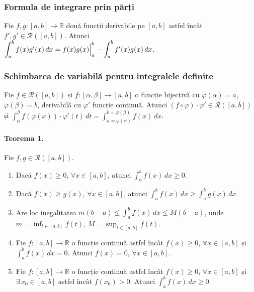 \subsubsection{Formula de integrare prin părți}
Fie $f, g:[a,b] \rightarrow \mathbb{R}$ două funcții derivabile pe $[a,b]$ astfel încât $f', g' \in \mathcal{R}([a,b])$.
Atunci \\ $\displaystyle\int_{a}^{b} f(x)g'(x) \, dx = \Bigl.f(x)g(x) \Bigr|_{a}^{b} - \displaystyle\int_{a}^{b} f'(x)g(x) \, dx$.

\subsubsection{Schimbarea de variabilă pentru integralele definite}
Fie $f \in \mathcal{R}([a,b])$ și $f:[\alpha, \beta] \rightarrow [a,b]$ o funcție bijectivă cu $\varphi(\alpha) = a$,
$\varphi(\beta) = b$, derivabilă cu $\varphi'$ funcție continuă. Atunci $(f \circ \varphi) \cdot \varphi' \in \mathcal{R}([a,b])$
și $\displaystyle\int_{\alpha}^{\beta} f(\varphi(x)) \cdot \varphi'(t) \, dt = \displaystyle\int_{a = \varphi(\alpha)}^{b = \varphi(\beta)} f(x) \, dx$.

\paragraph{Teorema 1.}
Fie $f, g \in \mathcal{R}([a,b])$.
\begin{enumerate}[label=\emph{\alph*})]
    \item Dacă $f(x) \geq 0$, $\forall x \in [a,b]$, atunci $\displaystyle\int_{a}^{b} f(x) \, dx \geq 0$.
    \item Dacă $f(x) \geq g(x)$, $\forall x \in [a,b]$, atunci $\displaystyle\int_{a}^{b} f(x) \, dx \geq \displaystyle\int_{a}^{b} g(x) \, dx$.
    \item Are loc inegalitatea $m(b-a) \leq \displaystyle\int_{a}^{b} f(x) \, dx \leq M(b-a)$, unde $m = \displaystyle\inf_{t \in [a,b]}f(t)$, $M = \displaystyle\sup_{t \in [a,b]}f(t)$.
    \item Fie $f:[a,b] \rightarrow \mathbb{R}$ o funcție continuă astfel încât $f(x) \geq 0$, $\forall x \in [a,b]$ și $\displaystyle\int_{a}^{b} f(x) \, dx=0$.
        Atunci $f(x) = 0$, $\forall x \in [a,b]$.
    \item Fie $f:[a,b] \rightarrow \mathbb{R}$ o funcție continuă astfel încât $f(x) \geq 0$, $\forall x \in [a,b]$ și $\exists \, x_{0} \in [a,b]$
        astfel încât $f(x_{0}) > 0$. Atunci $\displaystyle\int_{a}^{b} f(x) \, dx \geq 0$.
\end{enumerate}

